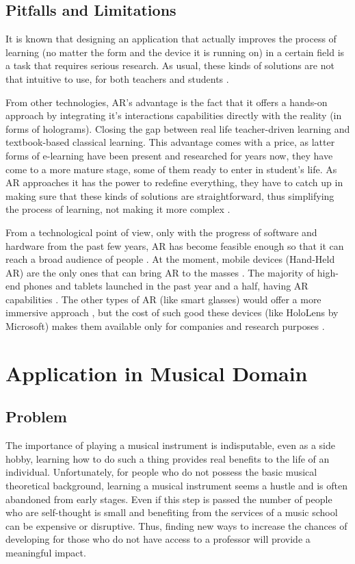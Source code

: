 \documentclass[12 pct]{report}
\begin{document}
\section{Pitfalls and Limitations}
It is known that designing an application that actually improves the process of learning (no matter the form and the device it is running on) in a certain field is a task that requires serious research. 
As usual, these kinds of solutions are not that intuitive to use, for both teachers and students \cite{wu2013current}. 

From other technologies, AR's advantage is the fact that it offers a hands-on approach by integrating it's interactions capabilities directly \cite{akccayir2017advantages} with the reality (in forms of holograms). 
Closing the gap between real life teacher-driven learning and textbook-based classical learning. 
This advantage comes with a price, as latter forms of e-learning have been present and researched for years now, they have come to a more mature stage, some of them ready to enter in student's life.
As AR approaches it has the power to redefine everything, they have to catch up in making sure that these kinds of solutions are straightforward, thus simplifying the process of learning, not making it more complex \cite{carmigniani2011augmented}.

From a technological point of view, only with the progress of software and hardware from the past few years, AR has become feasible enough so that it can reach a broad audience of people \cite{puyuelo2013experiencing}. 
At the moment, mobile devices (Hand-Held AR) are the only ones that can bring AR to the masses \cite{wagner2007handheld}. 
The majority of high-end phones and tablets launched in the past year and a half, having AR capabilities \cite{liao2018mobile}. 
The other types of AR (like smart glasses) would offer a more immersive approach \cite{dunleavy2009affordances}, but the cost of such good these devices (like HoloLens \cite{kress201711} by Microsoft) makes them available only for companies and research purposes \cite{lee2012augmented}.

\chapter{Application in Musical Domain}

\section{Problem}
The importance of playing a musical instrument is indisputable, even as a side hobby, learning how to do such a thing provides real benefits to the life of an individual. Unfortunately, for people who do not possess the basic musical theoretical background, learning a musical instrument seems a hustle and is often abandoned from early stages. Even if this step is passed the number of people who are self-thought is small and benefiting from the services of a music school can be expensive or disruptive. Thus, finding new ways to increase the chances of developing for those who do not have access to a professor will provide a meaningful impact.
\end{document}
